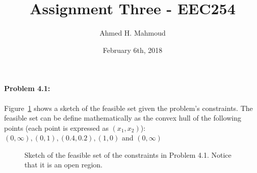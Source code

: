 \documentclass[12pt] {article}
\begin{document}
\title{Assignment Three -  EEC254}
\author{Ahmed H. Mahmoud}
\date{February 6th, 2018}
\maketitle




\paragraph{Problem 4.1:} 
Figure~\ref{fig:fig41} shows a sketch of the feasible set given the problem's constraints. The feasible set can be define mathematically as the convex hull of the following points (each point is expressed as $(x_1,x_2)$): $(0,\infty), (0,1), (0.4,0.2), (1,0)$ and $(0,\infty)$
\begin{figure}[!tbh]
\centering        
   \caption{Sketch of the feasible set of the constraints in Problem 4.1. Notice that it is an open region.}
   \label{fig:fig41}
\end{figure}
\end{document}
